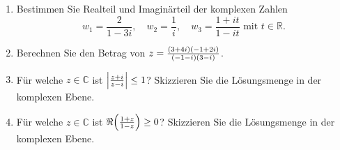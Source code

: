 \documentclass[german,12pt]{homework}
\DeclarePairedDelimiter{\absolute}{\lvert}{\rvert}
\DeclarePairedDelimiter{\enbrace}{(}{)}
\begin{document}
    \begin{problem}
        \begin{enumerate}
            \item Bestimmen Sie Realteil und Imaginärteil der komplexen Zahlen
            \[w_1 = \frac{2}{1 - 3i}, \quad w_2 = \frac{1}{i}, \quad w_3 =
            \frac{1 + it}{1 - it} \text{ mit }t \in \mathbb{R}.\]
            \item Berechnen Sie den Betrag von \(z = \frac{\enbrace*{3 +
            4i}\enbrace*{-1 + 2i}}{\enbrace*{-1 - i}\enbrace*{3 - i}}\).
            \item Für welche \(z \in \mathbb{C}\) ist \(\absolute*{\frac{z +
            i}{z - i}} \le 1\)? Skizzieren Sie die Lösungsmenge in der
            komplexen Ebene.
            \item Für welche \(z \in \mathbb{C}\) ist \(\Re\enbrace*{\frac{1 +
            z}{1 - z}} \ge 0\)? Skizzieren Sie die Lösungsmenge in der
            komplexen Ebene.
        \end{enumerate}
    \end{problem}
\end{document}
